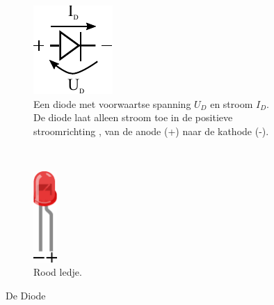 \documentclass{article}
\begin{document}
			\begin{figure}[htbp]
			\centering
				\begin{subfigure}[b]{0.45\linewidth}
					\centering
					\includegraphics{diode}
					\caption{Een diode met voorwaartse spanning $U_D$ en stroom $I_D$. De diode laat alleen stroom toe in de  positieve stroomrichting , van de anode (+) naar de kathode (-).}
					\label{fig:diode}
				\end{subfigure}
				~
				\begin{subfigure}[b]{0.45\linewidth}
					\centering
				\includegraphics[width=0.1\textwidth]{led}
				\caption{Rood ledje.}
				\label{fig:led}
				\end{subfigure}
				\caption{De Diode}
			\end{figure}
\end{document}
